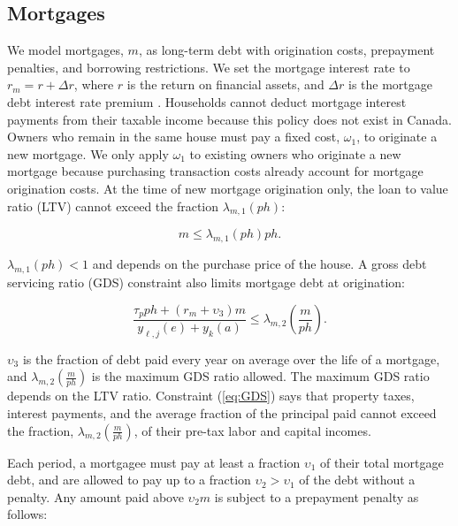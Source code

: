 \documentclass[parskip=full]{article}
\begin{document}
\subsection{Mortgages}\label{subsection:morgtages}

We model mortgages, $m$, as long-term debt with origination costs, prepayment penalties, and borrowing restrictions. We set the mortgage interest rate to $r_{m}=r+\Delta r$, where $r$ is the return on financial assets, and $\Delta r$ is the mortgage debt interest rate premium \citep{sommeretal-2013,sommersullivan-2017,kaplanetal-2019}. Households cannot deduct mortgage interest payments from their taxable income because this policy does not exist in Canada. Owners who remain in the same house must pay a fixed cost, $\omega_{1}$, to originate a new mortgage. We only apply $\omega_{1}$ to existing owners who originate a new mortgage because purchasing transaction costs already account for mortgage origination costs. At the time of new mortgage origination only, the loan to value ratio (LTV) cannot exceed the fraction $\lambda_{m,1}(ph)$:

\begin{equation}\label{eq:LTV}
m \leq \lambda_{m,1}(ph) p h.
\end{equation}

\noindent $\lambda_{m,1}(ph)<1$ and depends on the purchase price of the house. A gross debt servicing ratio (GDS) constraint also limits mortgage debt at origination: 

\begin{equation}\label{eq:GDS}
\frac{\tau_{p}ph+(r_{m}+\upsilon_{3})m}{y_{\ell,j}(e)+y_{k}(a)} \leq \lambda_{m,2}\left(\frac{m}{ph}\right).
\end{equation}

\noindent $\upsilon_{3}$ is the fraction of debt paid every year on average over the life of a mortgage, and $\lambda_{m,2}\left(\frac{m}{ph}\right)$ is the maximum GDS ratio allowed. The maximum GDS ratio depends on the LTV ratio. Constraint (\ref{eq:GDS}) says that property taxes, interest payments, and the average fraction of the principal paid cannot exceed the fraction, $\lambda_{m,2}\left(\frac{m}{ph}\right)$, of their pre-tax labor and capital incomes. 

Each period, a mortgagee must pay at least a fraction $\upsilon_{1}$ of their total mortgage debt, and are allowed to pay up to a fraction $\upsilon_{2}>\upsilon_{1}$ of the debt without a penalty. Any amount paid above $\upsilon_{2}m$ is subject to a prepayment penalty as follows: 
\end{document}

